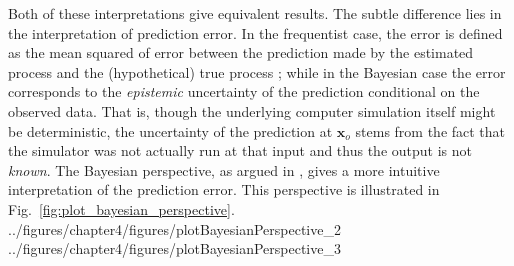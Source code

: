 Both of these interpretations give equivalent results.
The subtle difference lies in the interpretation of prediction error.
In the frequentist case, the error is defined as the mean squared of error between the prediction made by the estimated process and the (hypothetical) true process \cite{Isaaks1989};
while in the Bayesian case the error corresponds to the \emph{epistemic} uncertainty of the prediction conditional on the observed data.
That is, though the underlying computer simulation itself might be deterministic, 
the uncertainty of the prediction at $\bm{x}_o$ stems from the fact that the simulator was not actually run at that input and thus the output is not \emph{known}. 
The Bayesian perspective, as argued in \cite{Currin1991,Santner2003,OHagan2006}, gives a more intuitive interpretation of the prediction error.
This perspective is illustrated in Fig.~\ref{fig:plot_bayesian_perspective}.
{../figures/chapter4/figures/plotBayesianPerspective_2}
{../figures/chapter4/figures/plotBayesianPerspective_3}
